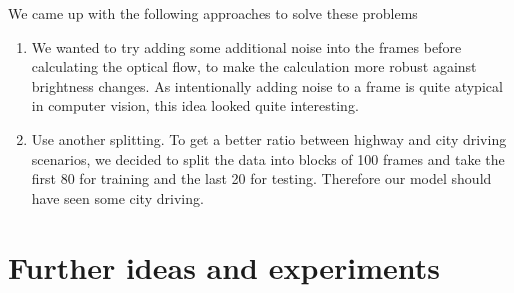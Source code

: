 \documentclass[conference]{IEEEtran}
\begin{document}
We came up with the following approaches to solve these problems
\begin{enumerate}[label=(\roman*)]
	\item We wanted to try adding some additional noise into the frames before calculating the optical flow, to make the calculation
	more robust against brightness changes. As intentionally adding 
	noise to a frame is quite atypical in computer vision, this idea looked quite interesting.
	\item Use another splitting. To get a better ratio between highway and city driving scenarios, we decided to split the data into
	blocks of 100 frames and take the first 80 for training and the last 20 for testing. Therefore our model should have seen some city
	driving.
\end{enumerate}




\section{Further ideas and experiments}
\end{document}
